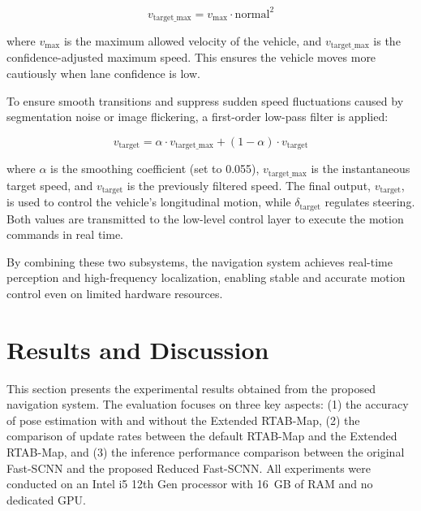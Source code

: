 \documentclass[conference, a4paper]{IEEEtran}
\begin{document}
\begin{equation}
	v_{\text{target\_max}} = v_{\text{max}} \cdot \text{normal}^2
	\label{eq:confidence_speed}
\end{equation}

where $v_{\text{max}}$ is the maximum allowed velocity of the vehicle, and $v_{\text{target\_max}}$ is the confidence-adjusted maximum speed. This ensures the vehicle moves more cautiously when lane confidence is low.

\par
To ensure smooth transitions and suppress sudden speed fluctuations caused by segmentation noise or image flickering, a first-order low-pass filter is applied:

\begin{equation}
	v_{\text{target}} = \alpha \cdot v_{\text{target\_max}} + (1 - \alpha) \cdot v_{\text{target}}
	\label{eq:low_pass_filter}
\end{equation}

where $\alpha$ is the smoothing coefficient (set to 0.055), $v_{\text{target\_max}}$ is the instantaneous target speed, and $v_{\text{target}}$ is the previously filtered speed. The final output, $v_{\text{target}}$, is used to control the vehicle’s longitudinal motion, while $\delta_{\text{target}}$ regulates steering. Both values are transmitted to the low-level control layer to execute the motion commands in real time.

\par
By combining these two subsystems, the navigation system achieves real-time perception and high-frequency localization, enabling stable and accurate motion control even on limited hardware resources.


\section{Results and Discussion} 
This section presents the experimental results obtained from the proposed navigation system. The evaluation focuses on three key aspects: (1) the accuracy of pose estimation with and without the Extended RTAB-Map, (2) the comparison of update rates between the default RTAB-Map and the Extended RTAB-Map, and (3) the inference performance comparison between the original Fast-SCNN and the proposed Reduced Fast-SCNN. All experiments were conducted on an Intel i5 12th Gen processor with 16~GB of RAM and no dedicated GPU.
\end{document}
